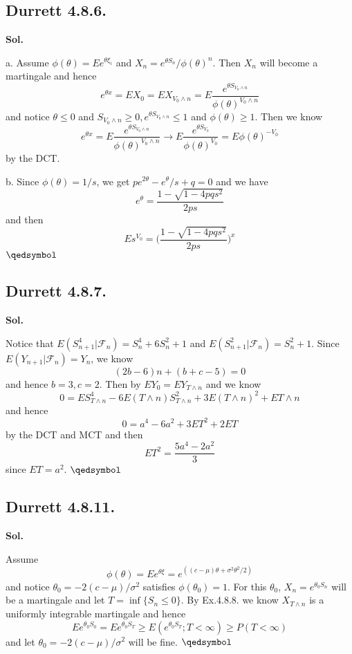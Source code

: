 \documentclass[lang=en,11pt,a4paper,citestyle =authoryear]{elegantpaper}
\newcommand{\prvd}{$\hfill \qedsymbol$}
\newcommand{\F}{\mathcal{F}}
\begin{document}
\subsection*{Durrett 4.8.6.} 
\textbf{Sol.} \par
a. Assume $\phi(\theta) = Ee^{\theta\xi_i}$ and $X_n = e^{\theta S_n}/\phi(\theta)^n$. Then $X_n$ will become a martingale and hence
\[e^{\theta x} = EX_0 = EX_{V_0\wedge n} = E\dfrac{e^{\theta S_{V_0\wedge n}}}{\phi(\theta)^{V_0\wedge n}}\]
and notice $\theta \leq 0$ and $S_{V_0\wedge n} \geq 0, e^{\theta S_{V_0 \wedge n}} \leq 1$ and $\phi(\theta) \geq 1$. Then we know
\[e^{\theta x} = E\dfrac{e^{\theta S_{V_0\wedge n}}}{\phi(\theta)^{V_0\wedge n}} \to E\dfrac{e^{\theta S_{V_0}}}{\phi(\theta)^{V_0}} = E\phi(\theta)^{-V_0}\]
by the DCT.\par
b. Since $\phi(\theta) = 1/s$, we get $pe^{2\theta} - e^{\theta}/s + q = 0$ and we have
\[e^{\theta} = \dfrac{1-\sqrt{1-4pqs^2}}{2ps}\]
and then
\[Es^{V_0} = \Big(\dfrac{1-\sqrt{1-4pqs^2}}{2ps}\Big)^x\]
\prvd
\vspace{0.5em}

\subsection*{Durrett 4.8.7.} 
\textbf{Sol.} \par
Notice that $E(S_{n+1}^4|\F_n) = S_n^4 + 6S_n^2+1$ and $E(S_{n+1}^2|\F_n) = S_n^2 + 1$. Since $E(Y_{n+1}|\F_n) = Y_n$, we know
\[(2b-6)n + (b+c-5) = 0\]
and hence $b=3,c=2$. Then by $EY_0 = EY_{T\wedge n}$ and we know
\[ 0 = ES_{T\wedge n}^4 - 6E(T\wedge n)S_{T\wedge n}^2 + 3E(T\wedge n)^2 +ET\wedge n\]
and hence 
\[ 0 = a^4 - 6a^2 + 3ET^2 + 2ET\]
by the DCT and MCT and then
\[ET^2 = \dfrac{5a^4-2a^2}{3}\]
since $ET = a^2$.
\prvd
\vspace{0.5em}

\subsection*{Durrett 4.8.11.} 
\textbf{Sol.} \par
Assume
\[\phi(\theta) = Ee^{\theta\xi} = e^{((c-\mu)\theta + \sigma^2\theta^2/2)}\]
and notice $\theta_0 = -2(c-\mu)/\sigma^2$ satisfies $\phi(\theta_0) = 1$. For this $\theta_0$, $X_n = e^{\theta_0S_n}$ will be a martingale and let $T = \inf\{S_n \leq 0\}$. By Ex.4.8.8. we know $X_{T\wedge n}$ is a uniformly integrable martingale and hence
\[Ee^{\theta_0S_0} = Ee^{\theta_0S_T} \geq E(e^{\theta_0S_T};T<\infty) \geq P(T<\infty)\]
and let $\theta_0 = -2(c-\mu)/\sigma^2$ will be fine. 
\prvd
\vspace{0.5em}

\addappheadtotoc
\end{document}
